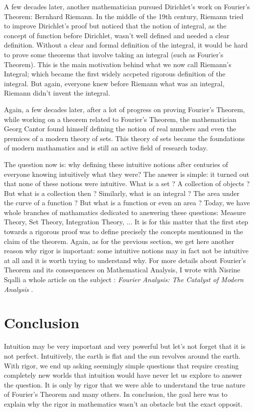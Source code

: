 \documentclass[12pt]{article}
\theoremstyle{definition}
\begin{document}
A few decades later, another mathematician pursued Dirichlet's work on Fourier's Theorem: Bernhard Riemann. In the middle of the 19th century, Riemann tried to improve Dirichlet's proof but noticed that the notion of integral, as the concept of function before Dirichlet, wasn't well defined and needed a clear definition. Without a clear and formal definition of the integral, it would be hard to prove some theorems that involve taking an integral (such as Fourier's Theorem). This is the main motivation behind what we now call Riemann's Integral; which became the first widely accpeted rigorous definition of the integral. But again, everyone knew before Riemann what was an integral, Riemann didn't invent the integral.

Again, a few decades later, after a lot of progress on proving Fourier's Theorem, while working on a theorem related to Fourier's Theorem, the mathematician Georg Cantor found himself defining the notion of real numbers and even the premices of a modern theory of sets. This theory of sets became the foundations of modern mathamatics and is still an active field of research today. 

The question now is: why defining these intuitive notions after centuries of everyone knowing intuitively what they were? The answer is simple: it turned out that none of these notions were intuitive. What is a set ? A collection of objects ? But what is a collection then ? Similarly, what is an integral ? The area under the curve of a function ? But what is a function or even an area ? Today, we have whole branches of mathamatics dedicated to answering these questions: Measure Theory, Set Theory, Integration Theory, ... It is for this matter that the first step towards a rigorous proof was to define precisely the concepts mentionned in the claim of the theorem. Again, as for the previous section, we get here another reason why rigor is important: some intuitive notions may in fact not be intuitive at all and it is worth trying to understand why. For more details about Fourier's Theorem and its consequences on Mathematical Analysis, I wrote with Nisrine Sqalli a whole article on the subject : \textit{Fourier Analysis: The Catalyst of Modern Analysis} \cite{fourier}.

\section{Conclusion}

Intuition may be very important and very powerful but let's not forget that it is not perfect. Intuitively, the earth is flat and the sun revolves around the earth. With rigor, we end up asking seemingly simple questions that require creating completely new worlds that intuition would have never let us explore to answer the question. It is only by rigor that we were able to understand the true nature of Fourier's Theorem and many others. In conclusion, the goal here was to explain why the rigor in mathematics wasn't an obstacle but the exact opposit.
\end{document}
